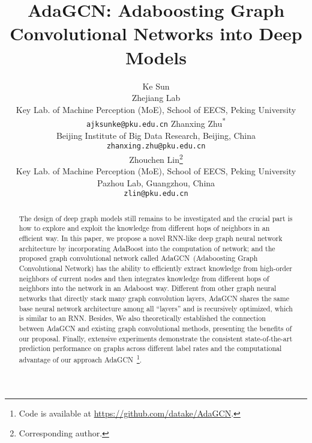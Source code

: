 \documentclass{article} \usepackage{iclr2021_conference,times}
\title{AdaGCN: Adaboosting Graph Convolutional Networks into Deep Models}
\author{Ke Sun \\
Zhejiang Lab\\
Key Lab. of Machine Perception (MoE), School of EECS, Peking University\\
\texttt{ajksunke@pku.edu.cn} 
\And
Zhanxing Zhu\textsuperscript{*} \\
Beijing Institute of Big Data Research, Beijing, China \\
\texttt{zhanxing.zhu@pku.edu.cn}\\
\AND
Zhouchen Lin\thanks{Corresponding author.} \\
Key Lab. of Machine Perception (MoE), School of EECS, Peking University \\
Pazhou Lab, Guangzhou, China\\
\texttt{zlin@pku.edu.cn} \\
}
\begin{document}
\maketitle



\begin{abstract}
The design of deep graph models still remains to be investigated and the crucial part is how to explore and exploit the knowledge from different hops of neighbors in an efficient way. In this paper, we propose a novel RNN-like deep graph neural network architecture by incorporating AdaBoost into the computation of network; and the proposed graph convolutional network called AdaGCN~(Adaboosting Graph Convolutional Network) has the ability to efficiently extract knowledge from high-order neighbors of current nodes and then integrates knowledge from different hops of neighbors into the network in an Adaboost way. Different from other graph neural networks that directly stack many graph convolution layers, AdaGCN shares the same base neural network architecture among all ``layers'' and is recursively optimized, which is similar to an RNN. Besides, We also theoretically established the connection between AdaGCN and existing graph convolutional methods, presenting the benefits of our proposal. Finally, extensive experiments demonstrate the consistent state-of-the-art prediction performance on graphs across different label rates and the computational advantage of our approach AdaGCN~\footnote{Code is available at \url{https://github.com/datake/AdaGCN}.}.
\end{abstract}
\end{document}
